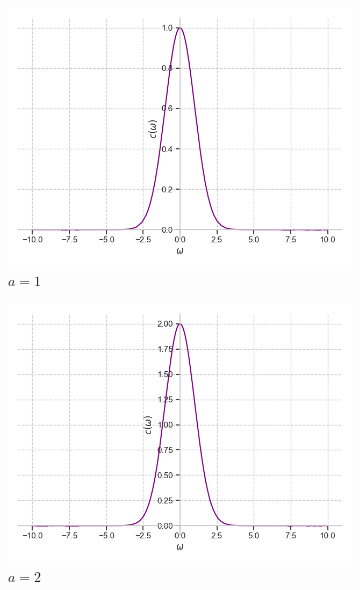 \documentclass[a4paper, 16pt]{article}
\begin{document}
    \begin{figure}[htbp]
        \centering
        \begin{subfigure}{0.3\textwidth}
            \centering
            \includegraphics[width=\linewidth]{gausfimgeq_a=1_b=zp5.png}
            \caption{$a=1$}
            \label{fig:gausfimgeq_1}
        \end{subfigure}
        \hfill
        \begin{subfigure}{0.3\textwidth}
            \centering
            \includegraphics[width=\linewidth]{gausfimgeq_a=2_b=zp5.png}
            \caption{$a=2$}
            \label{fig:gausfimgeq_2}
        \end{subfigure}
        \hfill
        \begin{subfigure}{0.3\textwidth}

\end{subfigure}
\end{figure}
\end{document}
